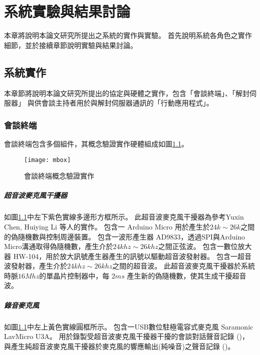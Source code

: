 \chapter{系統實驗與結果討論}

    本章將說明本論文研究所提出之系統的實作與實驗。
首先說明系統各角色之實作細節，並於接續章節說明實驗與結果討論。

\section{系統實作}

    本章節將說明本論文研究所提出的協定與硬體之實作，包含「會談終端」、「解封伺服器」
與供會談主持者用於與解封伺服器通訊的「行動應用程式」。

\subsection{會談終端}

    會談終端包含多個組件，其概念驗證實作硬體組成如圖\ref{fig:mbox}。

\begin{figure}[H]
    \centering
    \texttt{[image: mbox]}
    \caption{會談終端概念驗證實作}\label{fig:mbox}
\end{figure}


\paragraph{超音波麥克風干擾器}

    如圖\ref{fig:mbox}中左下紫色實線多邊形方框所示。
此超音波麥克風干擾器為參考Yuxin Chen,  Huiying Li 等人的實作\cite{chen2020wearable}。
包含一 Arduino Micro 用於產生於$24k\sim26k$之間的偽隨機數與控制周邊裝置。
包含一波形產生器 AD9833，透過SPI與Arduino Micro溝通取得偽隨機數，產生介於$24khz\sim26khz$之間正弦波。
包含一數位放大器 HW-104，用於放大訊號產生器產生的訊號以驅動超音波發射器。
包含一超音波發射器，產生介於$24khz\sim26khz$之間的超音波。
此超音波麥克風干擾器於系統時脈$16Mhz$的單晶片控制器中，每 $2ms$ 產生新的偽隨機數，使其生成干擾超音波。

\paragraph{錄音麥克風}

    如圖\ref{fig:mbox}中左上黃色實線圓框所示。
包含一USB數位駐極電容式麥克風 Saramonic LavMicro U3A。
用於錄製受超音波麥克風干擾器干擾的會談對話聲音記錄 (\DEFrecJ)，
與產生純超音波麥克風干擾器於麥克風的響應輸出(純噪音)之聲音記錄 (\DEFrecN)。

